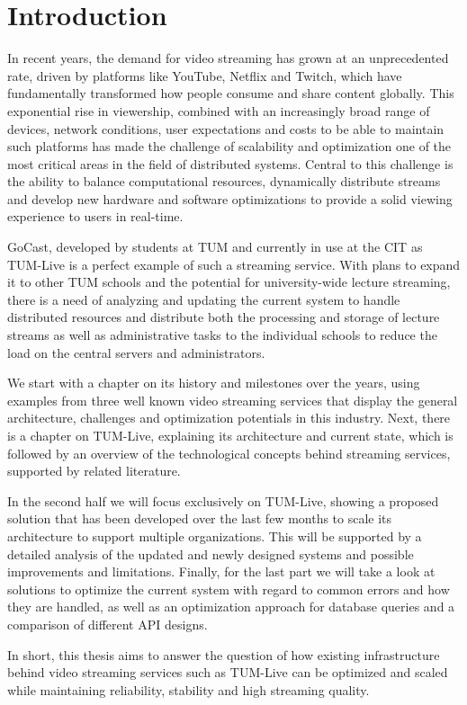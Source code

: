 
\chapter{Introduction}\label{chapter:introduction}

In recent years, the demand for video streaming has grown at an unprecedented rate, driven by platforms like YouTube, Netflix and Twitch, which have fundamentally transformed how people consume and share content globally. This exponential rise in viewership, combined with an increasingly broad range of devices, network conditions, user expectations and costs to be able to maintain such platforms has made the challenge of scalability and optimization one of the most critical areas in the field of distributed systems. Central to this challenge is the ability to balance computational resources, dynamically distribute streams and develop new hardware and software optimizations to provide a solid viewing experience to users in real-time.

GoCast, developed by students at \ac{TUM} and currently in use at the \ac{CIT} as TUM-Live is a perfect example of such a streaming service. With plans to expand it to other \ac{TUM} schools and the potential for university-wide lecture streaming, there is a need of analyzing and updating the current system to handle distributed resources and distribute both the processing and storage of lecture streams as well as administrative tasks to the individual schools to reduce the load on the central servers and administrators.

We start with a chapter on its history and milestones over the years, using examples from three well known video streaming services that display the general architecture, challenges and optimization potentials in this industry. Next, there is a chapter on TUM-Live, explaining its architecture and current state, which is followed by an overview of the technological concepts behind streaming services, supported by related literature.  

In the second half we will focus exclusively on TUM-Live, showing a proposed solution that has been developed over the last few months to scale its architecture to support multiple organizations. This will be supported by a detailed analysis of the updated and newly designed systems and possible improvements and limitations. Finally, for the last part we will take a look at solutions to optimize the current system with regard to common errors and how they are handled, as well as an optimization approach for database queries and a comparison of different \ac{API} designs.    

In short, this thesis aims to answer the question of how existing infrastructure behind video streaming services such as TUM-Live can be optimized and scaled while maintaining reliability, stability and high streaming quality.